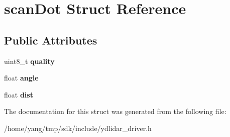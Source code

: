 \hypertarget{structscan_dot}{}\section{scan\+Dot Struct Reference}
\label{structscan_dot}
\subsection*{Public Attributes}
\begin{DoxyCompactItemize}
\item 
uint8\+\_\+t {\bfseries quality}\hypertarget{structscan_dot_ad4bb237b2544b87dd6d57a49b1168bc1}{}\label{structscan_dot_ad4bb237b2544b87dd6d57a49b1168bc1}

\item 
float {\bfseries angle}\hypertarget{structscan_dot_a97b573cb811b6ca7318c485a0c67e250}{}\label{structscan_dot_a97b573cb811b6ca7318c485a0c67e250}

\item 
float {\bfseries dist}\hypertarget{structscan_dot_af52fcb416f886a7f505c8baf6cabc87f}{}\label{structscan_dot_af52fcb416f886a7f505c8baf6cabc87f}

\end{DoxyCompactItemize}


The documentation for this struct was generated from the following file\+:\begin{DoxyCompactItemize}
\item 
/home/yang/tmp/sdk/include/ydlidar\+\_\+driver.\+h\end{DoxyCompactItemize}
